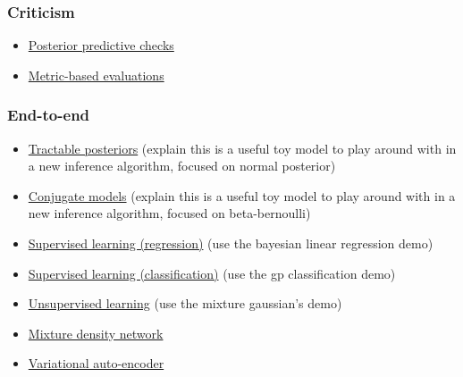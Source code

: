 \subsubsection{Criticism}

\begin{itemize}
  \item \href{tut_PPC.html}{Posterior predictive checks}
  \item \href{tut_metric_eval.html}{Metric-based evaluations}
\end{itemize}

\subsubsection{End-to-end}

\begin{itemize}
  \item \href{#}{Tractable posteriors} (explain this is a useful toy model to play
    around with in a new inference algorithm, focused on normal
    posterior)
  \item \href{#}{Conjugate models} (explain this is a useful toy model to play
    around with in a new inference algorithm, focused on
    beta-bernoulli)
  \item \href{#}{Supervised learning (regression)} (use the bayesian linear regression demo)
  \item \href{#}{Supervised learning (classification)} (use the gp classification demo)
  \item \href{#}{Unsupervised learning} (use the mixture gaussian's demo)
  \item \href{#}{Mixture density network}
  \item \href{#}{Variational auto-encoder}
\end{itemize}
